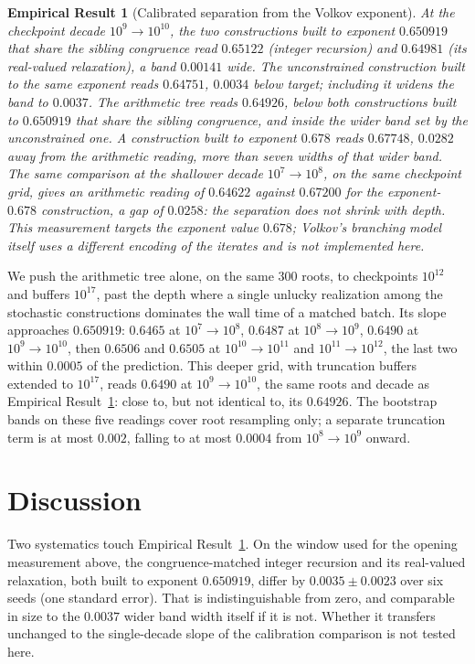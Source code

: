 \documentclass[11pt]{article}
\newtheorem{empirical}[theorem]{Empirical Result}
\theoremstyle{remark}
\begin{document}
\begin{empirical}[Calibrated separation from the Volkov exponent]
\label{thm:kl-calibrated}
At the checkpoint decade $10^9\!\to\!10^{10}$, the two constructions
built to exponent $0.650919$ that share the sibling congruence read
$0.65122$ (integer recursion) and $0.64981$ (its real-valued
relaxation), a band $0.00141$ wide. The unconstrained construction built
to the same exponent reads $0.64751$, $0.0034$ below target; including
it widens the band to $0.0037$. The arithmetic tree reads $0.64926$,
below both constructions built to $0.650919$ that share the sibling
congruence, and inside the wider band set by the unconstrained one. A construction built to exponent $0.678$
reads $0.67748$, $0.0282$ away from the arithmetic reading, more than
seven widths of that wider band. The same comparison at the shallower
decade $10^7\!\to\!10^8$, on the same checkpoint grid, gives an
arithmetic reading of $0.64622$ against $0.67200$ for the
exponent-$0.678$ construction, a gap of $0.0258$: the separation does
not shrink with depth. This measurement targets the exponent value $0.678$;
Volkov's branching model itself uses a different encoding of the
iterates and is not implemented here.
\end{empirical}

We push the arithmetic tree alone, on the same $300$ roots, to
checkpoints $10^{12}$ and buffers $10^{17}$, past the depth where a
single unlucky realization among the stochastic constructions
dominates the wall time of a matched batch. Its slope approaches
$0.650919$: $0.6465$ at $10^7\!\to\!10^8$, $0.6487$ at
$10^8\!\to\!10^9$, $0.6490$ at $10^9\!\to\!10^{10}$, then $0.6506$ and
$0.6505$ at $10^{10}\!\to\!10^{11}$ and $10^{11}\!\to\!10^{12}$, the
last two within $0.0005$ of the prediction. This deeper grid, with
truncation buffers extended to $10^{17}$, reads $0.6490$ at
$10^9\!\to\!10^{10}$, the same roots and decade as Empirical
Result~\ref{thm:kl-calibrated}: close to, but not identical to, its
$0.64926$. The bootstrap bands on these five readings cover root
resampling only; a separate truncation term is at most $0.002$,
falling to at most $0.0004$ from $10^8\!\to\!10^9$ onward.

\section{Discussion}
\label{sec:discussion}

Two systematics touch Empirical Result~\ref{thm:kl-calibrated}. On the
window used for the opening measurement above, the congruence-matched
integer recursion and its real-valued relaxation, both built to
exponent $0.650919$, differ by $0.0035\pm0.0023$ over six seeds (one
standard error). That is indistinguishable from zero, and comparable
in size to the $0.0037$ wider band width itself if it is not. Whether
it transfers unchanged to the single-decade slope of the calibration
comparison is not tested here.
\end{document}
